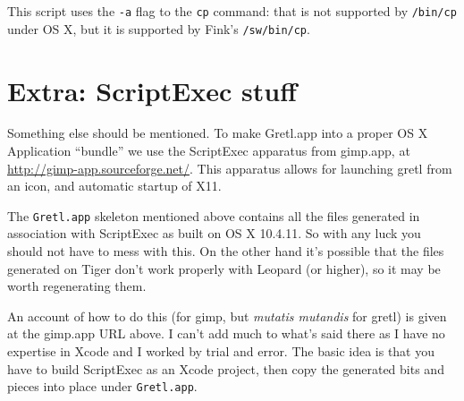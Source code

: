 \documentclass{article}
\begin{document}
This script uses the \texttt{-a} flag to the \texttt{cp} command: that
is not supported by \texttt{/bin/cp} under OS X, but it is supported by 
Fink's \texttt{/sw/bin/cp}.

\section{Extra: ScriptExec stuff}

Something else should be mentioned.  To make Gretl.app into a proper
OS X Application ``bundle'' we use the ScriptExec apparatus from
gimp.app, at \url{http://gimp-app.sourceforge.net/}.  This apparatus
allows for launching gretl from an icon, and automatic startup of X11.

The \texttt{Gretl.app} skeleton mentioned above contains all the files
generated in association with ScriptExec as built on OS X 10.4.11.
So with any luck you should not have to mess with this.  On the other
hand it's possible that the files generated on Tiger don't work
properly with Leopard (or higher), so it may be worth regenerating
them.

An account of how to do this (for gimp, but \textit{mutatis mutandis}
for gretl) is given at the gimp.app URL above.  I can't add much to
what's said there as I have no expertise in Xcode and I worked by trial
and error.  The basic idea is that you have to build ScriptExec as an
Xcode project, then copy the generated bits and pieces into place
under \texttt{Gretl.app}.
\end{document}
